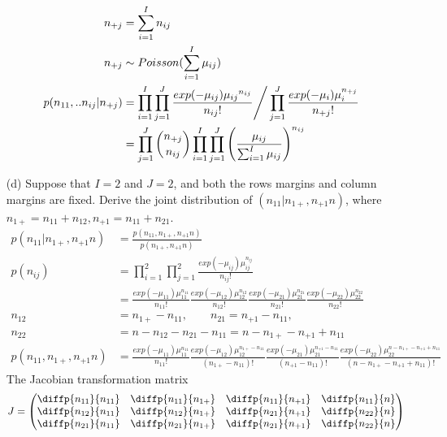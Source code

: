 \documentclass[11pt]{article} %
\begin{document}
\begin{itemize}
\begin{align*}
	n_{+j} &= \sum_{i=1}^I n_{ij}\\
	n_{+j} & \sim Poisson (\sum_{i=1}^I \mu_{ij})\\
	p(n_{11},..n_{ij}|n_{+j}) &= \prod_{i=1}^I \prod_{j=1}^J \frac{exp(-\mu_{ij})  {\mu_{ij}}^{n_{ij}}}{n_{ij}!} \Bigg{/} \prod_{j=1}^J \frac{exp(-\mu_i) \mu_i^{n_{+j}}}{n_{+j}!}\\
	&= \prod_{j=1}^J {n_{+j} \choose n_{ij}} \prod_{i=1}^I \prod_{j=1}^J \left( \frac{\mu_{ij}}{\sum_{i=1}^I \mu_{ij}} \right)^{n_{ij}}
\end{align*}	
	\item [(d)] Suppose that $I=2$ and $J=2$, and both the rows margins and column margins are fixed. Derive the joint distribution of $(n_{11}|n_{1+}, n_{+1} n)$, where $n_{1+} = n_{11} + n_{12}, n_{+1} = n_{11}+ n_{21}$.
\begin{align*}
	p(n_{11}|n_{1+}, n_{+1} n) &= \frac{p(n_{11}, n_{1+}, n_{+1} n)}{p(n_{1+}, n_{+1} n)}\\
		p(n_{ij}) &= \prod_{i=1}^2 \prod_{j=1}^2 \frac{exp(-\mu_{ij}) \mu_{ij}^{n_{ij}}}{n_{ij}!} \\
		&= \frac{exp(-\mu_{11})\mu_{11}^{n_{11}} }{n_{11}!} \frac{exp(-\mu_{12})\mu_{12}^{n_{12}}}{n_{12}!} \frac{exp(-\mu_{21})\mu_{21}^{n_{21}}}{n_{21}!} \frac{exp(-\mu_{22})\mu_{22}^{n_{22}}}{n_{22}!}\\
		n_{12} &= n_{1+} - n_{11}, \qquad n_{21} = n_{+1} - n_{11}, \\ n_{22} &= n - n_{12} - n_{21} - n_{11} = n- n_{1+} - n_{+1} + n_{11}\\
		p(n_{11}, n_{1+}, n_{+1} n) &= \frac{exp(-\mu_{11})\mu_{11}^{n_{11}} }{n_{11}!} \frac{exp(-\mu_{12})\mu_{12}^{n_{1+} - n_{11}}}{(n_{1+} - n_{11})!} \frac{exp(-\mu_{21})\mu_{21}^{n_{+1} - n_{11}}}{(n_{+1} - n_{11})!} \frac{exp(-\mu_{22})\mu_{22}^{n- n_{1+} - n_{+1} + n_{11}}}{(n- n_{1+} - n_{+1} + n_{11})!}
\end{align*}	
The Jacobian transformation matrix 
\begin{align*}
	J &=  \begin{pmatrix}
	\diffp{{n_{11}}}{{n_{11}}} & \diffp{{n_{11}}}{{n_{1+}}} & \diffp{{n_{11}}}{{n_{+1}}} & \diffp{{n_{11}}}{{n}}\\
	\diffp{{n_{12}}}{{n_{11}}} & \diffp{{n_{12}}}{{n_{1+}}} & \diffp{{n_{21}}}{{n_{+1}}} & \diffp{{n_{22}}}{{n}}\\
	\diffp{{n_{21}}}{{n_{11}}} & \diffp{{n_{21}}}{{n_{1+}}} & \diffp{{n_{21}}}{{n_{+1}}} & \diffp{{n_{22}}}{{n}}\\

\end{pmatrix}
\end{align*}
\end{itemize}
\end{document}
